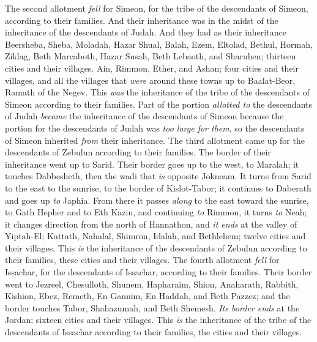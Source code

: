 \begin{biblechapter} %
 The second allotment \textit{fell} for Simeon, for the tribe of the descendants of Simeon, according to their families. And their inheritance was in the midst of the inheritance of the descendants of Judah.
\verse And they had as their inheritance Beersheba, Sheba, Moladah,
\verse Hazar Shual, Balah, Ezem,
\verse Eltolad, Bethul, Hormah,
\verse Ziklag, Beth Marcaboth, Hazar Susah,
\verse Beth Lebaoth, and Sharuhen; thirteen cities and their villages.
\verse Ain, Rimmon, Ether, and Ashan; four cities and their villages,
\verse and all the villages that \textit{were} around these towns up to Baalat-Beor, Ramath of the Negev. This \textit{was} the inheritance of the tribe of the descendants of Simeon according to their families.
\verse Part of the portion \textit{allotted to} the descendants of Judah \textit{became} the inheritance of the descendants of Simeon because the portion for the descendants of Judah was \textit{too large for them}, so the descendants of Simeon inherited \textit{from} their inheritance.
 The third allotment came up for the descendants of Zebulun according to their families. The border of their inheritance went up to Sarid.
\verse Their border goes up to the west, to Maralah; it touches Dabbesheth, then the wadi that \textit{is} opposite Jokneam.
\verse It turns from Sarid to the east to the sunrise, to the border of Kislot-Tabor; it continues to Daberath and goes up \textit{to} Japhia.
\verse From there it passes \textit{along} to the east toward the sunrise, to Gath Hepher and to Eth Kazin, and continuing \textit{to} Rimmon, it turns \textit{to} Neah;
\verse it changes direction from the north of Hannathon, and \textit{it ends} at the valley of Yiptah-El;
\verse Kattath, Nahalal, Shimron, Idalah, and Bethlehem; twelve cities and their villages.
\verse This \textit{is} the inheritance of the descendants of Zebulun according to their families, these cities and their villages.
 The fourth allotment \textit{fell} for Issachar, for the descendants of Issachar, according to their families.
\verse Their border went to Jezreel, Chesulloth, Shunem,
\verse Hapharaim, Shion, Anaharath,
\verse Rabbith, Kishion, Ebez,
\verse Remeth, En Gannim, En Haddah, and Beth Pazzez;
\verse and the border touches Tabor, Shahazumah, and Beth Shemesh. \textit{Its border ends} at the Jordan; sixteen cities and their villages.
\verse This \textit{is} the inheritance of the tribe of the descendants of Issachar according to their families, the cities and their villages.

\end{biblechapter}
